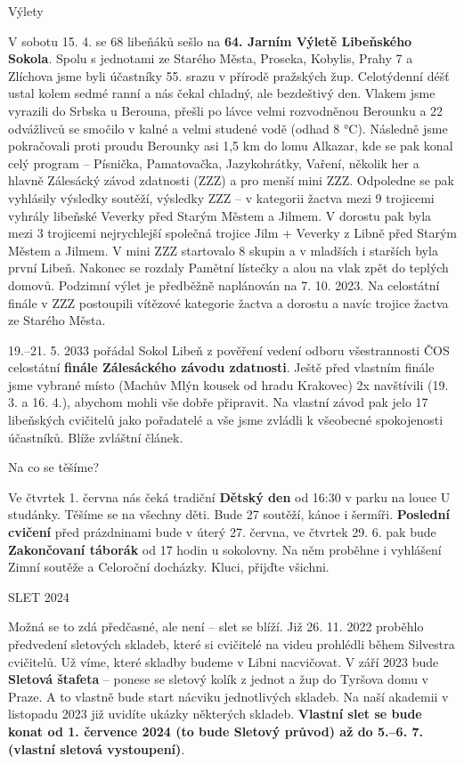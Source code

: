 \documentclass[11pt]{article}
\newcommand{\subpost}[1]{%
\vspace*{12pt}
\begin{center}
{\Large \tyrs #1}
\end{center}}
\begin{document}
\subpost{Výlety}
V sobotu 15. 4. se 68 libeňáků sešlo na \textbf{64. Jarním Výletě Libeňského Sokola}. Spolu s jednotami ze Starého Města, Proseka, Kobylis, Prahy 7 a Zlíchova jsme byli účastníky 55. srazu v přírodě pražských žup. Celotýdenní déšť ustal kolem sedmé ranní a nás čekal chladný, ale bezdeštivý den. Vlakem jsme vyrazili do Srbska u Berouna, přešli po lávce velmi rozvodněnou Berounku a 22 odvážlivců se smočilo v kalné a velmi studené vodě (odhad 8 °C). Následně jsme pokračovali proti proudu Berounky asi 1,5 km do lomu Alkazar, kde se pak konal celý program – Písnička, Pamatovačka, Jazykohrátky, Vaření, několik her a hlavně Zálesácký závod zdatnosti (ZZZ) a pro menší mini ZZZ. Odpoledne se pak vyhlásily výsledky soutěží, výsledky ZZZ – v kategorii žactva mezi 9 trojicemi vyhrály libeňské Veverky před Starým Městem a Jilmem. V dorostu pak byla mezi 3 trojicemi nejrychlejší společná trojice Jilm + Veverky z Libně před Starým Městem a Jilmem. V mini ZZZ startovalo 8 skupin a v mladších i starších byla první Libeň. Nakonec se rozdaly Pamětní lístečky a alou na vlak zpět do teplých domovů. Podzimní výlet je předběžně naplánován na 7. 10. 2023. Na celostátní finále v ZZZ postoupili vítězové kategorie žactva a dorostu a navíc trojice žactva ze Starého Města. 

19.–21. 5. 2033 pořádal Sokol Libeň z pověření vedení odboru všestrannosti ČOS celostátní \textbf{finále Zálesáckého závodu zdatnosti}. Ještě před vlastním finále jsme vybrané místo (Machův Mlýn kousek od hradu Krakovec) 2x navštívili (19. 3. a 16. 4.), abychom mohli vše dobře připravit. Na vlastní závod pak jelo 17 libeňských cvičitelů jako pořadatelé a vše jsme zvládli k všeobecné spokojenosti účastníků. Blíže zvláštní článek. 

\subpost{Na co se těšíme?}
Ve čtvrtek 1. června nás čeká tradiční \textbf{Dětský den} od 16:30 v parku na louce U studánky. Těšíme se na všechny děti. Bude 27 soutěží, kánoe i šermíři.
\textbf{Poslední cvičení} před prázdninami bude v úterý 27. června, ve čtvrtek 29. 6. pak bude \textbf{Zakončovaní táborák} od 17 hodin u sokolovny. Na něm proběhne i vyhlášení Zimní soutěže a Celoroční docházky. Kluci, přijďte všichni.

\subpost{SLET 2024}
Možná se to zdá předčasné, ale není – slet se blíží. Již 26. 11. 2022 proběhlo předvedení sletových skladeb, které si cvičitelé na videu prohlédli během Silvestra cvičitelů. Už víme, které skladby budeme v Libni nacvičovat. V září 2023 bude \textbf{Sletová štafeta} – ponese se sletový kolík z jednot a žup do Tyršova domu v Praze. A to vlastně bude start nácviku jednotlivých skladeb. Na naší akademii v listopadu 2023 již uvidíte ukázky některých skladeb. \textbf{Vlastní slet se bude konat od 1. července 2024 (to bude Sletový průvod) až do 5.–6. 7. (vlastní sletová vystoupení)}.
\end{document}

